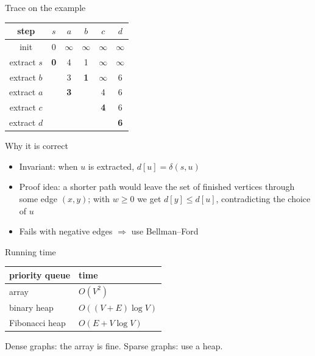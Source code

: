 \documentclass[aspectratio=169]{beamer}
\begin{document}
\begin{frame}{Trace on the example}
\centering
\begin{tabular}{c|ccccc}
step & $s$ & $a$ & $b$ & $c$ & $d$\\ \hline
init & 0 & $\infty$ & $\infty$ & $\infty$ & $\infty$\\
extract $s$ & \textbf{0} & 4 & 1 & $\infty$ & $\infty$\\
extract $b$ & & 3 & \textbf{1} & $\infty$ & 6\\
extract $a$ & & \textbf{3} & & 4 & 6\\
extract $c$ & & & & \textbf{4} & 6\\
extract $d$ & & & & & \textbf{6}
\end{tabular}
\end{frame}

\begin{frame}{Why it is correct}
\begin{itemize}
  \item Invariant: when $u$ is extracted, $d[u] = \delta(s,u)$
  \item Proof idea: a shorter path would leave the set of finished vertices through some edge $(x,y)$;
        with $w \ge 0$ we get $d[y] \le d[u]$, contradicting the choice of $u$
  \item Fails with negative edges $\Rightarrow$ use Bellman--Ford
\end{itemize}
\end{frame}

\begin{frame}{Running time}
\centering
\begin{tabular}{l|l}
priority queue & time \\ \hline
array & $O(V^2)$ \\
binary heap & $O((V+E)\log V)$ \\
Fibonacci heap & $O(E + V \log V)$
\end{tabular}
\medskip

Dense graphs: the array is fine. Sparse graphs: use a heap.
\end{frame}
\end{document}
